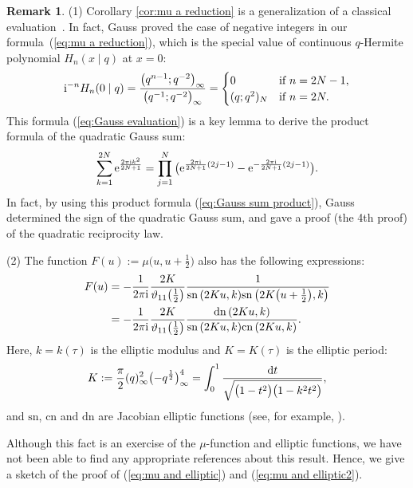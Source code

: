 \documentclass[pdftex]{sigma}
\numberwithin{equation}{section}
\theoremstyle{definition}
\newtheorem{rmk}[thm]{Remark}
\newcommand{\sn}{\mathrm{sn}\,}
\newcommand{\cn}{\mathrm{cn}\,}
\newcommand{\dn}{\mathrm{dn}\,}
\begin{document}
\begin{rmk}
(1) Corollary \ref{cor:mu a reduction} is a generalization of a classical evaluation~\cite{G}.
In fact, Gauss proved the case of negative integers in our formula~(\ref{eq:mu a reduction}), which is the special value of continuous $q$-Hermite polynomial $H_{n}(x \mid q)$ at $x=0$:
\begin{gather}
\label{eq:Gauss evaluation}
{\rm i}^{-n}H_{n}(0 \mid q)
 =
 \frac{\big(q^{n-1};q^{-2}\big)_{\infty}}{\big(q^{-1};q^{-2}\big)_{\infty}}
 =\begin{cases}
 0 & \text{if } n=2N-1,\\
 (q;q^{2})_{N} & \text{if } n=2N.
 \end{cases}
\end{gather}
This formula (\ref{eq:Gauss evaluation}) is a key lemma to derive the product formula of the quadratic Gauss sum:
\begin{gather}
\label{eq:Gauss sum product}
\sum_{k=1}^{2N}{\rm e}^{\frac{2\pi{\rm i} k^{2}}{2N+1}}
 =
 \prod_{j=1}^{N}
 \big({\rm e}^{\frac{2\pi{\rm i}}{2N+1}(2j-1)}-{\rm e}^{-\frac{2\pi{\rm i}}{2N+1}(2j-1)}\big).
\end{gather}
In fact, by using this product formula (\ref{eq:Gauss sum product}), Gauss determined the sign of the quadratic Gauss sum, and gave a proof (the 4th proof) of the quadratic reciprocity law.

(2) The function $F(u):=\mu \big(u,u+\frac{1}{2}\big)$ also has the following expressions:
\begin{align}
\label{eq:mu and elliptic}
F(u)
 &=
 -\frac{1}{2\pi{\rm i}}\frac{2K}{\vartheta _{11}\big(\frac{1}{2}\big)}\frac{1}{\sn{(2Ku,k)}\sn{\big(2K\big(u+\frac{1}{2}\big),k\big)}} \\
\label{eq:mu and elliptic2}
 &=
 -\frac{1}{2\pi{\rm i}}\frac{2K}{\vartheta _{11}\big(\frac{1}{2}\big)}\frac{\dn{(2Ku,k)}}{\sn{(2Ku,k)}\cn{(2Ku,k)}}.
\end{align}
Here, $k=k(\tau )$ is the elliptic modulus
and $K=K(\tau )$ is the elliptic period:
\[
K:=\frac{\pi }{2}(q)_{\infty }^{2}\big({-}q^{\frac{1}{2}}\big)_{\infty }^{4}=\int_{0}^{1}\frac{{\rm d}t}{\sqrt{\big(1-t^{2}\big)\big(1-k^{2}t^{2}\big)}},
\]
and $\mathrm{sn}$, $\mathrm{cn}$ and $\mathrm{dn}$ are Jacobian elliptic functions (see, for example, \cite[Chapter~11]{BW}).

Although this fact is an exercise of the $\mu$-function and elliptic functions, we have not been able to find any appropriate references about this result.
Hence, we give a sketch of the proof of (\ref{eq:mu and elliptic}) and (\ref{eq:mu and elliptic2}).




\end{rmk}
\end{document}
